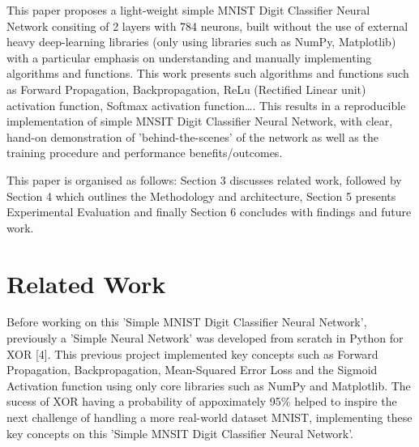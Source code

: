 \documentclass[11pt]{article}
\begin{document}
\vspace{1em}
This paper proposes a light-weight simple MNIST Digit Classifier Neural Network \cite{simplemnsit} consiting of 2 layers with 784 neurons, built without the use of external heavy deep-learning libraries  (only using libraries such as NumPy, Matplotlib) with a particular emphasis on understanding and manually implementing algorithms and functions. This work presents such algorithms and functions such as Forward Propagation, Backpropagation, ReLu (Rectified Linear unit) activation function, Softmax activation function\dots. This results in a reproducible implementation of simple MNSIT Digit Classifier Neural Network, with clear, hand-on demonstration of 'behind-the-scenes' of the network as well as the training procedure and performance benefits/outcomes.

\vspace{1em}
This paper is organised as follows: Section 3 discusses related work, followed by Section 4 which outlines the Methodology and architecture, Section 5 presents Experimental Evaluation and finally Section 6 concludes with findings and future work.


\section{Related Work}
Before working on this 'Simple MNIST Digit Classifier Neural Network', previously a 'Simple Neural Network' was developed from scratch in Python for XOR [4]. This previous project implemented key concepts such as Forward Propagation, Backpropagation, Mean-Squared Error Loss and the Sigmoid Activation function using only core libraries such as NumPy and Matplotlib. The sucess of XOR having a probability of appoximately 95\% helped to inspire the next challenge of handling a more real-world dataset MNIST, implementing these key concepts on this 'Simple MNSIT Digit Classifier Neural Network'.
\end{document}
